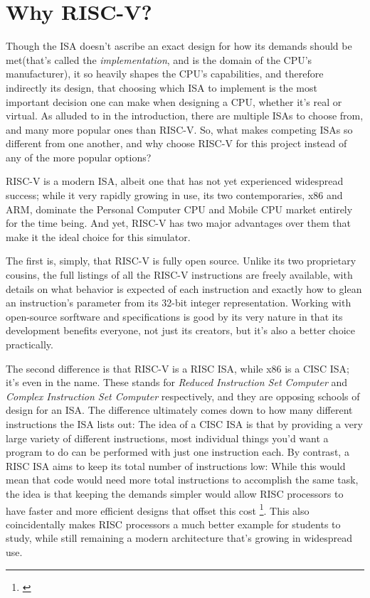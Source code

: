 \documentclass[12pt,twoside]{reedthesis}
\begin{document}
\section{Why RISC-V?}
Though the ISA doesn't ascribe an exact design for how its demands should be met(that's called the \textit{implementation}, and is the domain of the CPU's manufacturer), it so heavily shapes the CPU's capabilities, and therefore indirectly its design, that choosing which ISA to implement is the most important decision one can make when designing a CPU, whether it's real or virtual. As alluded to in the introduction, there are multiple ISAs to choose from, and many more popular ones than RISC-V. So, what makes competing ISAs so different from one another, and why choose RISC-V for this project instead of any of the more popular options?


RISC-V is a modern ISA, albeit one that has not yet experienced widespread success; while it very rapidly growing in use, its two contemporaries, x86 and ARM, dominate the Personal Computer CPU and Mobile CPU market entirely for the time being. And yet, RISC-V has two major advantages over them that make it the ideal choice for this simulator.

The first is, simply, that RISC-V is fully open source. Unlike its two proprietary cousins, the full listings of all the RISC-V instructions are freely available, with details on what behavior is expected of each instruction and exactly how to glean an instruction's parameter from its 32-bit integer representation. Working with open-source sorftware and specifications is good by its very nature in that its development benefits everyone, not just its creators, but it's also a better choice practically.

The second difference is that RISC-V is a RISC ISA, while x86 is a CISC ISA; it's even in the name. These stands for \textit{Reduced Instruction Set Computer} and \textit{Complex Instruction Set Computer} respectively, and they are opposing schools of design for an ISA. The difference ultimately comes down to how many different instructions the ISA lists out: The idea of a CISC ISA is that by providing a very large variety of different instructions, most individual things you'd want a program to do can be performed with just one instruction each. By contrast, a RISC ISA aims to keep its total number of instructions low: While this would mean that code would need more total instructions to accomplish the same task, the idea is that keeping the demands simpler would allow RISC processors to have faster and more efficient designs that offset this cost \footnote{\cite{denning}}. This also coincidentally makes RISC processors a much better example for students to study, while still remaining a modern architecture that's growing in widespread use.
\end{document}
